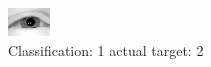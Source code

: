 \begin{figure}[h!]
\begin{center}
\includegraphics[width=0.60\columnwidth]{figures/ID2261_class_1_target_2.png}
\end{center}
\caption{ Classification: 1 actual target: 2}
\label{fig:ID2261_class_1_target_2}
\end{figure}
